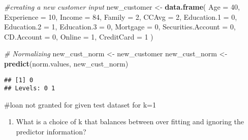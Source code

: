 \documentclass[
]{article}
\newenvironment{Shaded}{\begin{snugshade}}{\end{snugshade}}
\newcommand{\AttributeTok}[1]{\textcolor[rgb]{0.13,0.29,0.53}{#1}}
\newcommand{\CommentTok}[1]{\textcolor[rgb]{0.56,0.35,0.01}{\textit{#1}}}
\newcommand{\DecValTok}[1]{\textcolor[rgb]{0.00,0.00,0.81}{#1}}
\newcommand{\FunctionTok}[1]{\textcolor[rgb]{0.13,0.29,0.53}{\textbf{#1}}}
\newcommand{\NormalTok}[1]{#1}
\newcommand{\OtherTok}[1]{\textcolor[rgb]{0.56,0.35,0.01}{#1}}
\newcommand{\SpecialCharTok}[1]{\textcolor[rgb]{0.81,0.36,0.00}{\textbf{#1}}}
\providecommand{\tightlist}{%
  \setlength{\itemsep}{0pt}\setlength{\parskip}{0pt}}
\begin{document}
\begin{Shaded}
\begin{Highlighting}[]
\CommentTok{\#creating a new customer input}
\NormalTok{new\_customer }\OtherTok{\textless{}{-}} \FunctionTok{data.frame}\NormalTok{(}
  \AttributeTok{Age =} \DecValTok{40}\NormalTok{,}
  \AttributeTok{Experience =} \DecValTok{10}\NormalTok{,}
  \AttributeTok{Income =} \DecValTok{84}\NormalTok{,}
  \AttributeTok{Family =} \DecValTok{2}\NormalTok{,}
  \AttributeTok{CCAvg =} \DecValTok{2}\NormalTok{,}
  \AttributeTok{Education.1 =} \DecValTok{0}\NormalTok{,}
  \AttributeTok{Education.2 =} \DecValTok{1}\NormalTok{,}
  \AttributeTok{Education.3 =} \DecValTok{0}\NormalTok{,}
  \AttributeTok{Mortgage =} \DecValTok{0}\NormalTok{,}
  \AttributeTok{Securities.Account =} \DecValTok{0}\NormalTok{,}
  \AttributeTok{CD.Account =} \DecValTok{0}\NormalTok{,}
  \AttributeTok{Online =} \DecValTok{1}\NormalTok{,}
  \AttributeTok{CreditCard =} \DecValTok{1}
\NormalTok{)}

\CommentTok{\# Normalizing}
\NormalTok{new\_cust\_norm }\OtherTok{\textless{}{-}}\NormalTok{ new\_customer}
\NormalTok{new\_cust\_norm }\OtherTok{\textless{}{-}} \FunctionTok{predict}\NormalTok{(norm.values, new\_cust\_norm)}
\end{Highlighting}
\end{Shaded}

\begin{Shaded}
\end{Shaded}

\begin{verbatim}
## [1] 0
## Levels: 0 1
\end{verbatim}

\#loan not granted for given test dataset for k=1

\begin{enumerate}
\def\labelenumi{\arabic{enumi})}
\setcounter{enumi}{1}
\tightlist
\item
  What is a choice of k that balances between over fitting and ignoring
  the predictor information?
\end{enumerate}
\end{document}
